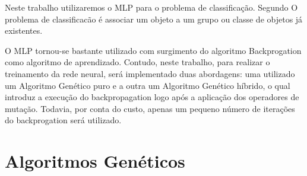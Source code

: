 \documentclass[12pt]{article}
\begin{document}
\par Neste trabalho utilizaremos o MLP para o problema de classificação. Segundo \cite{kasabov} O problema de classificacão é associar um objeto a um grupo ou classe de objetos já existentes. 

\par O MLP tornou-se bastante utilizado com surgimento do algoritmo Backprogation como algoritmo de aprendizado. Contudo, neste trabalho, para realizar o treinamento da rede neural, será implementado duas abordagens: uma utilizado um Algoritmo Genético puro e a outra um Algoritmo Genético híbrido, o qual introduz a execução do backpropagation logo após a aplicação dos operadores de mutação. Todavia, por conta do custo, apenas um pequeno número de iterações do backprogation será utilizado.

\section{Algoritmos Genéticos}
\end{document}
